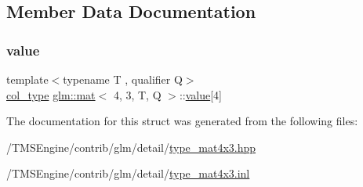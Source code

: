 \subsection{Member Data Documentation}
\mbox{\label{structglm_1_1mat_3_014_00_013_00_01_t_00_01_q_01_4_ad14b8b7424e4b4cadee7d85cedc61b7a}} 
\subsubsection{\texorpdfstring{value}{value}}
{\footnotesize\ttfamily template$<$typename T , qualifier Q$>$ \\
\hyperlink{structglm_1_1mat_3_014_00_013_00_01_t_00_01_q_01_4_ab7cb76d6290691108c8af724270e3b6c}{col\+\_\+type} \hyperlink{structglm_1_1mat}{glm\+::mat}$<$ 4, 3, T, Q $>$\+::\hyperlink{_s_d_l__opengl__glext_8h_a8ad81492d410ff2ac11f754f4042150f}{value}\mbox{[}4\mbox{]}\hspace{0.3cm}{\ttfamily [private]}}



The documentation for this struct was generated from the following files\+:\begin{DoxyCompactItemize}
\item 
/\+T\+M\+S\+Engine/contrib/glm/detail/\hyperlink{type__mat4x3_8hpp}{type\+\_\+mat4x3.\+hpp}\item 
/\+T\+M\+S\+Engine/contrib/glm/detail/\hyperlink{type__mat4x3_8inl}{type\+\_\+mat4x3.\+inl}\end{DoxyCompactItemize}
